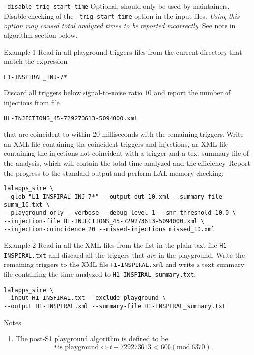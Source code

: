 \begin{entry}
\begin{entry}
\item[\texttt{--disable-trig-start-time}] Optional, should only be used by
maintainers. Disable checking of the \texttt{--trig-start-time} option in the
input files. \emph{Using this option may caused total analyzed times to be
reported incorrectly.} See note in algorithm section below.
\end{entry}

\item[Example 1] Read in all playground triggers files from the current
directory that match the expression 
\begin{verbatim}
L1-INSPIRAL_INJ-7*
\end{verbatim}
Discard all triggers below signal-to-noise ratio $10$ and report the number of
injections from file 
\begin{verbatim}
HL-INJECTIONS_45-729273613-5094000.xml
\end{verbatim}
that are coincident to within $20$ milliseconds with the remaining triggers.
Write an XML file containing the coincident triggers and injections, an XML
file containing the injections not coincident with a trigger and a text
summary file of the analysis, which will contain the total time analyzed and
the efficiency. Report the progress to the standard output and perform LAL
memory checking:
\begin{verbatim}
lalapps_sire \
--glob "L1-INSPIRAL_INJ-7*" --output out_10.xml --summary-file summ_10.txt \
--playground-only --verbose --debug-level 1 --snr-threshold 10.0 \
--injection-file HL-INJECTIONS_45-729273613-5094000.xml \
--injection-coincidence 20 --missed-injections missed_10.xml
\end{verbatim}

\item[Example 2] Read in all the XML files from the list in the plain text
file \verb$H1-INSPIRAL.txt$ and discard all the triggers that \emph{are} in
the playground. Write the remaining triggers to the XML file
\verb$H1-INSPIRAL.xml$ and write a text summary file containing the time
analyzed to \verb$H1-INSPIRAL_summary.txt$:
\begin{verbatim}
lalapps_sire \
--input H1-INSPIRAL.txt --exclude-playground \
--output H1-INSPIRAL.xml --summary-file H1-INSPIRAL_summary.txt
\end{verbatim}

\item[Notes]
\begin{enumerate}
\item The post-S1 playground algorithm is defined to be
\begin{equation}
t \ \textrm{is playground} \iff t - 729273613 < 600 (\textrm{mod}\ 6370).
\end{equation}


\end{enumerate}
\end{entry}
